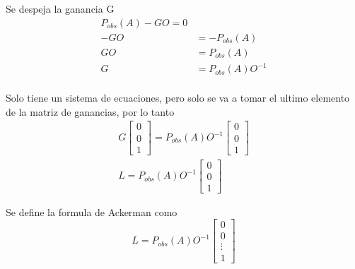 Se despeja la ganancia G
\[
    \begin{split}
        P_{obs}(A) - GO = 0 \\
        - GO & = - P_{obs}(A) \\
        GO & = P_{obs}(A) \\
        G & = P_{obs}(A)O^{-1} \\
    \end{split}
\]

Solo tiene un sistema de ecuaciones, pero solo se va a tomar el ultimo elemento de la matriz de ganancias, por lo tanto
\[
    \begin{split}
        G\begin{bmatrix}
            0 \\ 0 \\ 1
        \end{bmatrix} =
        P_{obs}(A)O^{-1}
        \begin{bmatrix}
            0 \\ 0 \\ 1
        \end{bmatrix}\\
        L = P_{obs}(A)O^{-1}
        \begin{bmatrix}
            0 \\ 0 \\ 1
        \end{bmatrix}
    \end{split}
\]

Se define la formula de Ackerman como
\[
    L = P_{obs}(A)O^{-1} 
    \begin{bmatrix}
        0 \\ 0 \\ \vdots \\ 1
    \end{bmatrix}
\]